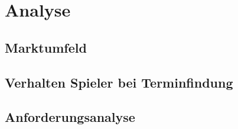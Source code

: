\chapter{Analyse}
\section{Marktumfeld}
\section{Verhalten Spieler bei Terminfindung}
\section{Anforderungsanalyse}
